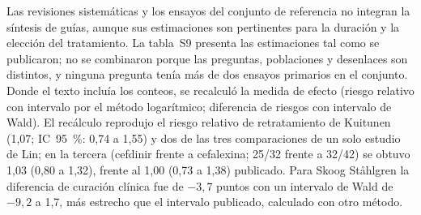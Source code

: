 \documentclass[10pt,a4paper]{article}
\begin{document}
Las revisiones sistemáticas y los ensayos del conjunto de referencia no integran la síntesis de guías, aunque sus estimaciones son pertinentes para la duración y la elección del tratamiento. La tabla~S9 presenta las estimaciones tal como se publicaron; no se combinaron porque las preguntas, poblaciones y desenlaces son distintos, y ninguna pregunta tenía más de dos ensayos primarios en el conjunto. Donde el texto incluía los conteos, se recalculó la medida de efecto (riesgo relativo con intervalo por el método logarítmico; diferencia de riesgos con intervalo de Wald). El recálculo reprodujo el riesgo relativo de retratamiento de Kuitunen (1,07; IC~95~\%: 0,74 a 1,55) y dos de las tres comparaciones de un solo estudio de Lin; en la tercera (cefdinir frente a cefalexina; 25/32 frente a 32/42) se obtuvo 1,03 (0,80 a 1,32), frente al 1,00 (0,73 a 1,38) publicado. Para Skoog Ståhlgren la diferencia de curación clínica fue de $-3{,}7$ puntos con un intervalo de Wald de $-9{,}2$ a 1,7, más estrecho que el intervalo publicado, calculado con otro método.
\end{document}
